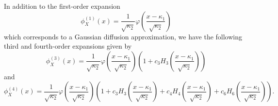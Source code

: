 \documentclass[12pt]{article}
\numberwithin{equation}{section}
\begin{document}
\noindent
 In addition to the first-order expansion
\begin{equation} 
\nonumber %
\phi_X^{(1)}(x)=
\frac{1}{\sqrt{\kappa_2}}
\varphi \left( \frac{x-\kappa_1}{\sqrt{\kappa_2}}\right)
\end{equation}
which corresponds to a Gaussian diffusion approximation,
we have the following third and fourth-order expansions given by 
\begin{equation} 
\nonumber %
\phi_X^{(3)}(x)=
\frac{1}{\sqrt{\kappa_2}}
\varphi \left( \frac{x-\kappa_1}{\sqrt{\kappa_2}}\right)
\left( 1 +
c_3 H_3\left(
\frac{x-\kappa_1}{\sqrt{\kappa_2}} \right)
\right)
\end{equation}
 and
\begin{equation} 
\nonumber %
\phi_X^{(4)}(x)=
\frac{1}{\sqrt{\kappa_2}}
\varphi \left( \frac{x-\kappa_1}{\sqrt{\kappa_2}}\right)
\left( 1 +
c_3 H_3\left(
\frac{x-\kappa_1}{\sqrt{\kappa_2}} \right)
+
c_4 H_4\left(
\frac{x-\kappa_1}{\sqrt{\kappa_2}} \right)
 + c_6 H_6\left( \frac{x-\kappa_1}{\sqrt{\kappa_2}} \right)
 \right).
\end{equation}
\end{document}
